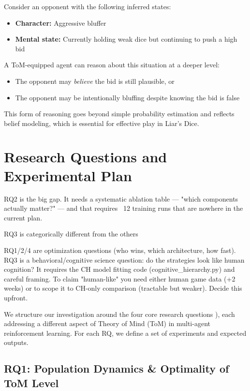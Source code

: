 \documentclass{article}
\begin{document}
Consider an opponent with the following inferred states:
\begin{itemize}
    \item \textbf{Character:} Aggressive bluffer
    \item \textbf{Mental state:} Currently holding weak dice but continuing to push a high bid
\end{itemize}

A ToM-equipped agent can reason about this situation at a deeper level:
\begin{itemize}
    \item The opponent may \emph{believe} the bid is still plausible, or
    \item The opponent may be intentionally bluffing despite knowing the bid is false
\end{itemize}

This form of reasoning goes beyond simple probability estimation and reflects belief modeling, which is essential for effective play in Liar’s Dice.


\section{Research Questions and Experimental Plan}
 RQ2 is the big gap. It needs a systematic ablation table — "which components actually matter?" — and that requires ~12 training runs
  that are nowhere in the current plan.


  RQ3 is categorically different from the others

  RQ1/2/4 are optimization questions (who wins, which architecture, how fast). RQ3 is a behavioral/cognitive science question: do the
  strategies look like human cognition? It requires the CH model fitting code (cognitive_hierarchy.py) and careful framing. To claim
  "human-like" you need either human game data (+2 weeks) or to scope it to CH-only comparison (tractable but weaker). Decide this
  upfront.

We structure our investigation around the four core research questions ), each addressing a different aspect of Theory of Mind (ToM) in multi-agent reinforcement learning. For each RQ, we define a set of experiments and expected outputs.

\subsection{RQ1: Population Dynamics \& Optimality of ToM Level}
\end{document}
